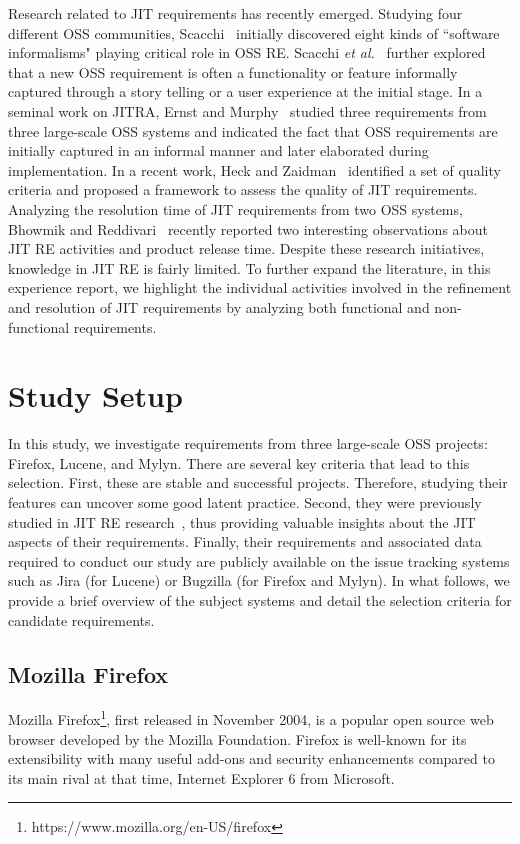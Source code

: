 \documentclass[review]{elsarticle}
\begin{document}
Research related to JIT requirements has recently emerged. Studying four different OSS communities, Scacchi~\cite{scacchi02} initially discovered eight kinds of ``software informalisms" playing critical role in OSS RE. Scacchi \textit{et al.}~\cite{scacchi05} further explored that a new OSS requirement is often a functionality or feature informally captured through a story telling or a user experience at the initial stage. In a seminal work on JITRA, Ernst and Murphy~\cite{ernst12} studied three requirements from three large-scale OSS systems and indicated the fact that OSS requirements are initially captured in an informal manner and later elaborated during implementation. In a recent work, Heck and Zaidman~\cite{heck15} identified a set of quality criteria and proposed a framework to assess the quality of JIT requirements. Analyzing the resolution time of JIT requirements from two OSS systems, Bhowmik and Reddivari~\cite{bhowmik15} recently reported two interesting observations about JIT RE activities and product release time. Despite these research initiatives, knowledge in JIT RE is fairly limited. To further expand the literature, in this experience report, we highlight the individual activities involved in the refinement and resolution of JIT requirements by analyzing both functional and non-functional requirements.

\section{Study Setup}
In this study, we investigate requirements from three large-scale OSS projects: Firefox, Lucene, and Mylyn. There are several key criteria that lead to this selection. First, these are stable and successful projects. Therefore, studying their features can uncover some good latent practice. Second, they were previously studied in JIT RE research~\cite{ernst12, bhowmik15}, thus providing valuable insights about the JIT aspects of their requirements. Finally, their requirements and associated data required to conduct our study are publicly available on the issue tracking systems such as Jira (for Lucene) or Bugzilla (for Firefox and Mylyn). In what follows, we provide a brief overview of the subject systems and detail the selection criteria for candidate requirements.

\subsection{Mozilla Firefox}
Mozilla Firefox\footnote{https://www.mozilla.org/en-US/firefox}, first released in November 2004, is a popular open source web browser developed by the Mozilla Foundation. Firefox is well-known for its extensibility with many useful add-ons and security enhancements compared to its main rival at that time, Internet Explorer 6 from Microsoft.
\end{document}
